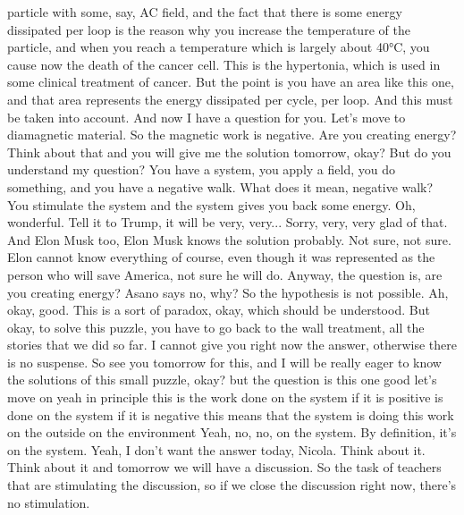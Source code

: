 particle with some, say, AC field, and the fact that there is some energy dissipated per loop is the reason why you increase the temperature of the particle, and when you reach a temperature which is largely about 40°C, you cause now the death of the cancer cell. This is the hypertonia, which is used in some clinical treatment of cancer. But the point is you have an area like this one, and that area represents the energy dissipated per cycle, per loop. And this must be taken into account. And now I have a question for you. Let's move to diamagnetic material. So the magnetic work is negative. Are you creating energy? Think about that and you will give me the solution tomorrow, okay? But do you understand my question? You have a system, you apply a field, you do something, and you have a negative walk. What does it mean, negative walk? You stimulate the system and the system gives you back some energy. Oh, wonderful. Tell it to Trump, it will be very, very... Sorry, very, very glad of that. And Elon Musk too, Elon Musk knows the solution probably. Not sure, not sure. Elon cannot know everything of course, even though it was represented as the person who will save America, not sure he will do. Anyway, the question is, are you creating energy? Asano says no, why? So the hypothesis is not possible. Ah, okay, good. This is a sort of paradox, okay, which should be understood. But okay, to solve this puzzle, you have to go back to the wall treatment, all the stories that we did so far. I cannot give you right now the answer, otherwise there is no suspense. So see you tomorrow for this, and I will be really eager to know the solutions of this small puzzle, okay? but the question is this one good let's move on yeah in principle this is the work done on the system if it is positive is done on the system if it is negative this means that the system is doing this work on the outside on the environment Yeah, no, no, on the system. By definition, it's on the system. Yeah, I don't want the answer today, Nicola. Think about it. Think about it and tomorrow we will have a discussion. So the task of teachers that are stimulating the discussion, so if we close the discussion right now, there's no stimulation.
